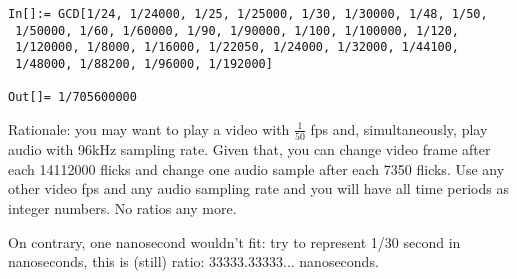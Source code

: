\begin{lstlisting}
In[]:= GCD[1/24, 1/24000, 1/25, 1/25000, 1/30, 1/30000, 1/48, 1/50, 
 1/50000, 1/60, 1/60000, 1/90, 1/90000, 1/100, 1/100000, 1/120, 
 1/120000, 1/8000, 1/16000, 1/22050, 1/24000, 1/32000, 1/44100, 
 1/48000, 1/88200, 1/96000, 1/192000]

Out[]= 1/705600000
\end{lstlisting}

Rationale: you may want to play a video with $\frac{1}{50}$ fps and, simultaneously, play audio with 96kHz sampling rate.
Given that, you can change video frame after each 14112000 flicks and change one audio sample after each 7350 flicks.
Use any other video fps and any audio sampling rate and you will have all time periods as integer numbers.
No ratios any more.

On contrary, one nanosecond wouldn't fit: try to represent 1/30 second in nanoseconds, this is (still) ratio: 33333.33333... nanoseconds.

